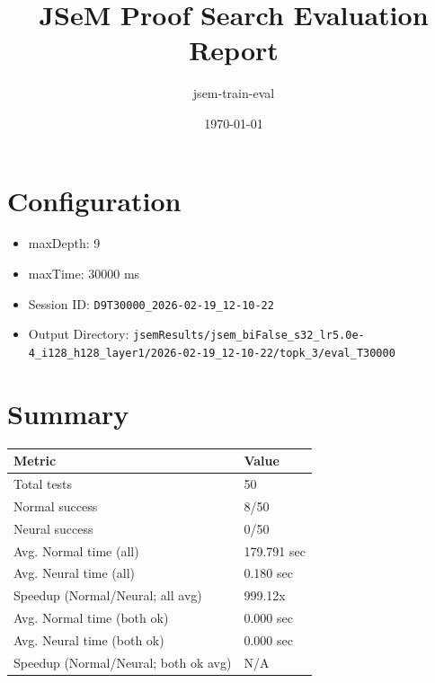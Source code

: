 \documentclass[a4paper,10pt]{article}
\title{JSeM Proof Search Evaluation Report}
\author{jsem-train-eval}
\date{\today}
\begin{document}
\maketitle

\section{Configuration}
\begin{itemize}
\item maxDepth: 9
\item maxTime: 30000 ms
\item Session ID: \texttt{D9T30000\_2026-02-19\_12-10-22}
\item Output Directory: \texttt{jsemResults/jsem\_biFalse\_s32\_lr5.0e-4\_i128\_h128\_layer1/2026-02-19\_12-10-22/topk\_3/eval\_T30000}
\end{itemize}

\section{Summary}
\begin{tabular}{ll}
\toprule
\textbf{Metric} & \textbf{Value} \\
\midrule
Total tests & 50 \\
Normal success & 8/50 \\
Neural success & 0/50 \\
\midrule
Avg. Normal time (all) & 179.791 sec \\
Avg. Neural time (all) & 0.180 sec \\
Speedup (Normal/Neural; all avg) & 999.12x \\
Avg. Normal time (both ok) & 0.000 sec \\
Avg. Neural time (both ok) & 0.000 sec \\
Speedup (Normal/Neural; both ok avg) & N/A \\
\bottomrule
\end{tabular}
\end{document}
